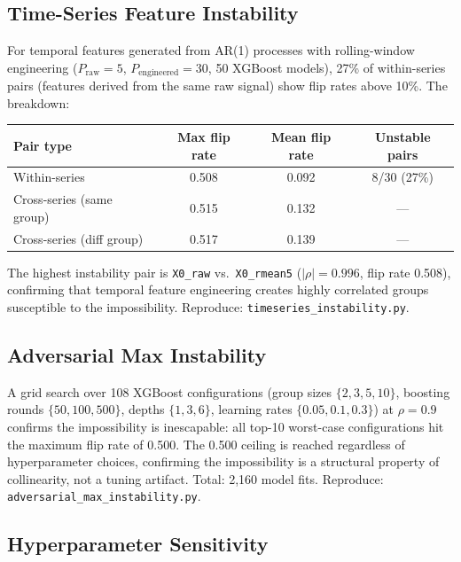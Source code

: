 \documentclass{article}
\begin{document}
\subsection{Time-Series Feature Instability}
\label{sec:timeseries}

For temporal features generated from AR(1) processes with rolling-window engineering ($P_{\text{raw}}{=}5$, $P_{\text{engineered}}{=}30$, 50 XGBoost models), 27\% of within-series pairs (features derived from the same raw signal) show flip rates above 10\%. The breakdown:

\begin{center}
\small
\begin{tabular}{@{}lccc@{}}
\toprule
Pair type & Max flip rate & Mean flip rate & Unstable pairs \\
\midrule
Within-series       & 0.508 & 0.092 & 8/30 (27\%) \\
Cross-series (same group) & 0.515 & 0.132 & --- \\
Cross-series (diff group) & 0.517 & 0.139 & --- \\
\bottomrule
\end{tabular}
\end{center}

The highest instability pair is \texttt{X0\_raw} vs.\ \texttt{X0\_rmean5} ($|\rho|{=}0.996$, flip rate 0.508), confirming that temporal feature engineering creates highly correlated groups susceptible to the impossibility.
Reproduce: \texttt{timeseries\_instability.py}.

\subsection{Adversarial Max Instability}
\label{sec:adversarial}

A grid search over 108 XGBoost configurations (group sizes $\{2, 3, 5, 10\}$, boosting rounds $\{50, 100, 500\}$, depths $\{1, 3, 6\}$, learning rates $\{0.05, 0.1, 0.3\}$) at $\rho{=}0.9$ confirms the impossibility is inescapable: all top-10 worst-case configurations hit the maximum flip rate of 0.500. The 0.500 ceiling is reached regardless of hyperparameter choices, confirming the impossibility is a structural property of collinearity, not a tuning artifact. Total: 2,160 model fits.
Reproduce: \texttt{adversarial\_max\_instability.py}.

\subsection{Hyperparameter Sensitivity}
\label{sec:hyperparameter-sensitivity}
\end{document}
